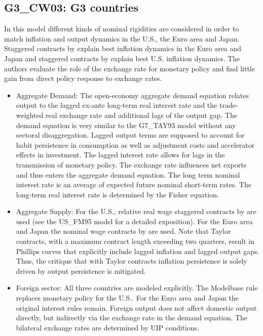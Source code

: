 \documentclass[11pt,a4paper]{article}
\begin{document}
	
	\subsection{G3\_CW03: \cite{CoenenWieland2002} G3 countries}
	\label{G3CW03}
	In this model different kinds of nominal rigidities are considered in order to match inflation and output dynamics in the U.S., the Euro area and Japan. Staggered contracts by \cite{Taylor1980} explain best inflation dynamics in the Euro area and Japan and staggered contracts by \cite{FuhrerMoore1995} explain best U.S. inflation dynamics. The authors evaluate the role of the exchange rate for monetary policy and find little gain from direct policy response to exchange rates.
	\begin{itemize}
		\item Aggregate Demand: The open-economy aggregate demand equation relates output to the lagged ex-ante long-term real interest rate and the trade-weighted real exchange rate and additional lags of the output gap. The demand equation is very similar to the G7\_TAY93 model without any sectoral disaggregation. Lagged output terms are supposed to account for habit persistence in consumption as well as adjustment costs and accelerator effects in investment. The lagged interest rate allows for lags in the transmission of monetary policy. The exchange rate influences net exports and thus enters the aggregate demand equation. The long term nominal interest rate is an average of expected future nominal short-term rates. The long-term  real interest rate is determined by the Fisher equation.
		\item Aggregate Supply: For the U.S., relative real wage staggered contracts by \cite{FuhrerMoore1995} are used (see the US\_FM95 model for a detailed exposition). For the Euro area and Japan the nominal wage contracts by \cite{Taylor1980} are used. Note that Taylor contracts, with a maximum contract length exceeding two quarters, result in Phillips curves that explicitly include lagged inflation and lagged output gaps. Thus, the critique that with Taylor contracts inflation persistence is solely driven by output persistence  \citep{FuhrerMoore1995} is mitigated.
		\item Foreign sector: All three countries are modeled explicitly. The Modelbase rule replaces monetary policy for the U.S.. For the Euro area and Japan the original interest rules remain. Foreign output does not affect domestic output directly, but indirectly via the exchange rate in the demand equation. The bilateral exchange rates are determined by UIP conditions.

\end{itemize}
\end{document}
